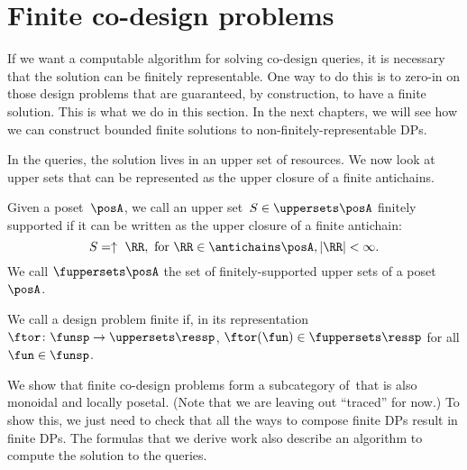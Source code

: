 \section{Finite co-design problems}

If we want a computable algorithm for solving co-design queries, it is necessary that the solution can be finitely representable. One way to do this is to zero-in on those design problems that are guaranteed, by construction, to have a finite solution. This is what we do in this section.
In the next chapters, we will see how we can construct bounded finite solutions to non-finitely-representable DPs.


In the \FixFunMinRes queries, the solution lives in an upper set of resources. We now look at upper sets that can be represented as the upper closure of a finite antichains.

\begin{definition}
    \label{def:fuppersets}
Given a poset~$\posA$, we call an upper set~$S \in \uppersets \posA$ finitely supported
if it can be written as the upper closure of a finite antichain:
\begin{equation}
    S = \uparrow~\RR, \text{ for } \RR \in \antichains \posA, |\RR| < \infty.
\end{equation}
We call $\fuppersets \posA$ the set of finitely-supported upper sets of a poset~$\posA$.
\end{definition}

\begin{definition}
    We call a design problem finite if, in its representation $\ftor \colon \funsp \to \uppersets \ressp$,
    $\ftor(\fun) \in \fuppersets\ressp$ for all $\fun\in\funsp$.
\end{definition}

We show that finite co-design problems form a subcategory of~\DP that is also monoidal and locally posetal. (Note that we are leaving out ``traced'' for now.) To show this, we just need to check that all the ways to compose finite DPs result in finite DPs.
The formulas that we derive work also describe an algorithm to compute the solution to the queries.


